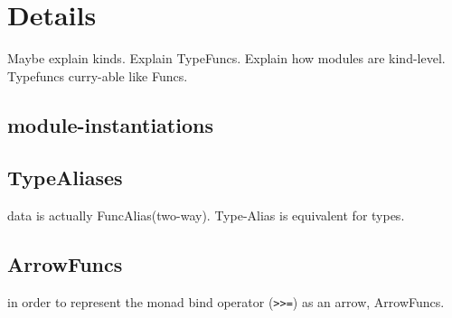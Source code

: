 \section{Details}
\begin{multicols}{2}
\columnbreak
Maybe explain kinds.
Explain TypeFuncs.
Explain how modules are kind-level.
Typefuncs curry-able like Funcs.
\end{multicols}

\subsection{module-instantiations}
\subsection{TypeAliases}
data is actually FuncAlias(two-way). Type-Alias is equivalent for types.

\subsection{ArrowFuncs}
in order to represent the monad bind operator (\texttt{>>=}) as an arrow, ArrowFuncs.
